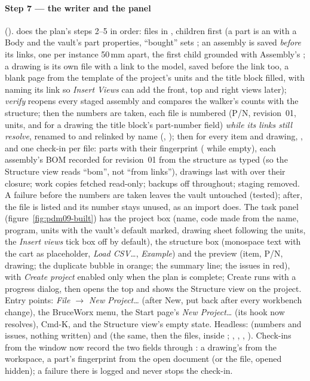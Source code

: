\paragraph{Step 7 --- the writer and the panel} ().  does the
plan's steps 2--5 in order: files in , children first (a part is an
 with a Body and the vault's part properties, ``bought'' sets ; an assembly is saved
\emph{before} its links, one  per instance 50\,mm apart, the first child grounded with Assembly's
; a drawing is its own file with a link to the model, saved before the link too, a blank page from
the template of the project's units and the title block filled, with  naming its link so \emph{Insert
Views} can add the front, top and right views later); \emph{verify} reopens every staged assembly and compares the
walker's counts with the structure; then the numbers are taken, each file is numbered (P/N, revision~01, units,
and for a drawing the title block's part-number field) \emph{while its links still resolve}, renamed to
 and relinked by name (, ); then 
for every item and drawing, , and one check-in per file: parts with their fingerprint
( while empty), each assembly's BOM recorded for revision~01 from the structure as typed (so the
Structure view reads ``bom'', not ``from links''), drawings last with  over their closure; work
copies fetched read-only; backups off throughout; staging removed. A failure before the numbers are taken leaves
the vault untouched (tested); after, the file is listed and its number stays unused, as an import does. The task
panel (figure~\ref{fig:pdm09-built}) has the project box (name, code made from the name, program, units with the
vault's default marked, drawing sheet following the units, the \emph{Insert views} tick box off by default), the
structure box (monospace text with the cart as placeholder, \emph{Load CSV\ldots}, \emph{Example}) and the preview
(item, P/N, drawing; the duplicate bubble in orange; the summary line; the issues in red), with \emph{Create
project} enabled only when the plan is complete; Create runs with a progress dialog, then opens the top and shows
the Structure view on the project. Entry points: \emph{File $\rightarrow$ New Project\ldots} (after New, put
back after every workbench change), the BruceWorx menu, the Start page's \emph{New Project\ldots} (its
 hook now resolves), Cmd-K, and the Structure view's empty state. Headless:
 (numbers and issues, nothing written) and
 (the same, then the files, inside ; , ,
, ). Check-ins from the window now record the two fields through
: a drawing's  from the workspace, a part's fingerprint
from the open document (or the file, opened hidden); a failure there is logged and never stops the check-in.

